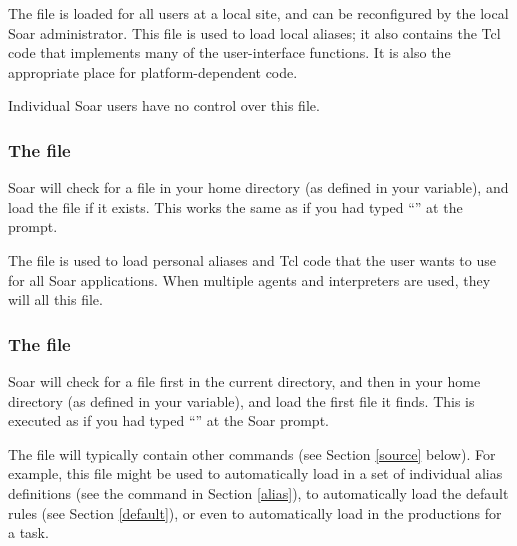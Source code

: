 {The  file is loaded for all users at a local
site, and can be reconfigured by the local Soar administrator. This file is used
to load local aliases; it also contains the Tcl code that implements many of
the user-interface functions. It is also the appropriate place for
platform-dependent code.

Individual Soar users have no control over this file.


\subsubsection*{The  file}


Soar will check for a  file in your home directory (as defined
in your  variable), and load the file if it exists. This works
the same as if you had typed ``'' at the prompt.

The  file is used to load personal aliases and Tcl code that
the user wants to use for all Soar applications. When multiple agents and
interpreters are used, they will all  this file.



\subsubsection*{The  file}

Soar will check for a  file first in the current directory,
and then in your home directory (as defined in your  variable),
and load the first  file it finds. This is executed 
as if you had typed ``'' at the Soar prompt.


The  file will typically contain other  commands
(see Section \ref{source} below). For example, this file might be used to
automatically load in a set of individual alias definitions (see the
 command in Section \ref{alias}), to automatically load the
default rules (see Section \ref{default}), or even to automatically load in
the productions for a task.

}
